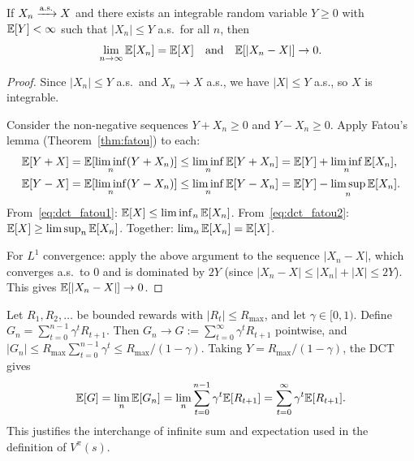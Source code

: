 \documentclass[11pt,a4paper]{article}
\begin{document}
\begin{keyresult}[title={Dominated Convergence Theorem}]
\begin{theorem}
\label{thm:dct}
If $X_n \xrightarrow{\text{a.s.}} X$ and there exists an integrable random variable
$Y \geq 0$ with $\mathbb{E}[Y] < \infty$ such that $|X_n| \leq Y$ a.s.\
for all $n$, then
\begin{equation}
  \lim_{n \to \infty} \mathbb{E}[X_n] = \mathbb{E}[X]
  \quad \text{and} \quad
  \mathbb{E}[|X_n - X|] \to 0.
  \label{eq:dct}
\end{equation}
\end{theorem}
\end{keyresult}

\begin{proof}
Since $|X_n| \leq Y$ a.s.\ and $X_n \to X$ a.s., we have
$|X| \leq Y$ a.s., so $X$ is integrable.

Consider the non-negative sequences $Y + X_n \geq 0$ and
$Y - X_n \geq 0$.  Apply Fatou's lemma
(Theorem~\ref{thm:fatou}) to each:
\begin{align}
  \mathbb{E}[Y + X]
  &= \mathbb{E}[\liminf_n (Y + X_n)]
  \leq \liminf_n \mathbb{E}[Y + X_n]
  = \mathbb{E}[Y] + \liminf_n \mathbb{E}[X_n],
  \label{eq:dct_fatou1} \\
  \mathbb{E}[Y - X]
  &= \mathbb{E}[\liminf_n (Y - X_n)]
  \leq \liminf_n \mathbb{E}[Y - X_n]
  = \mathbb{E}[Y] - \limsup_n \mathbb{E}[X_n].
  \label{eq:dct_fatou2}
\end{align}
From~\eqref{eq:dct_fatou1}:
$\mathbb{E}[X] \leq \liminf_n \mathbb{E}[X_n]$.
From~\eqref{eq:dct_fatou2}:
$\mathbb{E}[X] \geq \limsup_n \mathbb{E}[X_n]$.
Together: $\lim_n \mathbb{E}[X_n] = \mathbb{E}[X]$.

For $L^1$ convergence: apply the above argument to the sequence
$|X_n - X|$, which converges a.s.\ to $0$ and is dominated by
$2Y$ (since $|X_n - X| \leq |X_n| + |X| \leq 2Y$).  This gives
$\mathbb{E}[|X_n - X|] \to 0$.
\end{proof}

\begin{example}
\label{ex:dct_sum}
Let $R_1, R_2, \ldots$ be bounded rewards with $|R_t| \leq
R_{\max}$, and let $\gamma \in [0,1)$.  Define
$G_n = \sum_{t=0}^{n-1} \gamma^t R_{t+1}$.  Then
$G_n \to G := \sum_{t=0}^\infty \gamma^t R_{t+1}$ pointwise,
and $|G_n| \leq R_{\max} \sum_{t=0}^{n-1} \gamma^t \leq
R_{\max}/(1-\gamma)$.  Taking
$Y = R_{\max}/(1-\gamma)$, the DCT gives
\begin{equation}
  \mathbb{E}[G] = \lim_n \mathbb{E}[G_n]
  = \lim_n \sum_{t=0}^{n-1} \gamma^t \mathbb{E}[R_{t+1}]
  = \sum_{t=0}^\infty \gamma^t \mathbb{E}[R_{t+1}].
\end{equation}
This justifies the interchange of infinite sum and expectation
used in the definition of $V^\pi(s)$.
\end{example}
\end{document}
